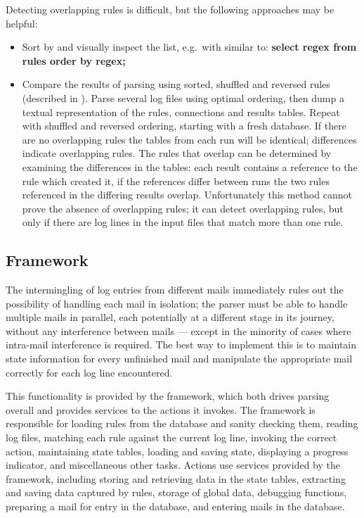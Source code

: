 Detecting overlapping rules is difficult, but the following approaches may
be helpful:

\begin{itemize}

    \item Sort by \regex{} and visually inspect the list, e.g.\ with \SQL{}
        similar to: \textbf{select regex from rules order by regex;}

    \item Compare the results of parsing using sorted, shuffled and
        reversed rules (described in ).  Parse several log files using optimal ordering, then
        dump a textual representation of the rules, connections and results
        tables.  Repeat with shuffled and reversed ordering, starting with
        a fresh database.  If there are no overlapping rules the tables
        from each run will be identical; differences indicate overlapping
        rules.  The rules that overlap can be determined by examining the
        differences in the tables: each result contains a reference to the
        rule which created it, if the references differ between runs the
        two rules referenced in the differing results overlap.
        Unfortunately this method cannot prove the absence of overlapping
        rules; it can detect overlapping rules, but only if there are log
        lines in the input files that match more than one rule.

\end{itemize}


\subsection{Framework}

\label{framework}

The intermingling of log entries from different mails immediately rules out
the possibility of handling each mail in isolation; the parser must be able
to handle multiple mails in parallel, each potentially at a different stage
in its journey, without any interference between mails --- except in the
minority of cases where intra-mail interference is required.  The best way
to implement this is to maintain state information for every unfinished
mail and manipulate the appropriate mail correctly for each log line
encountered.

This functionality is provided by the framework, which both drives parsing
overall and provides services to the actions it invokes.  The framework is
responsible for loading rules from the database and sanity checking them,
reading log files, matching each rule against the current log line,
invoking the correct action, maintaining state tables, loading and saving
state, displaying a progress indicator, and miscellaneous other tasks.
Actions use services provided by the framework, including storing and
retrieving data in the state tables, extracting and saving data captured by
rules, storage of global data, debugging functions, preparing a mail for
entry in the database, and entering mails in the database.

